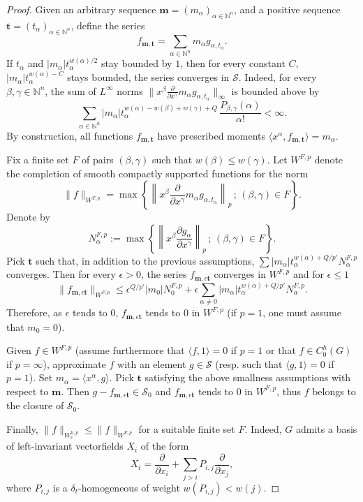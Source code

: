 \documentclass[11pt]{article}
\theoremstyle{definition}
\numberwithin{equation}{section}
\numberwithin{figure}{section}
\numberwithin{table}{section}
\newcommand{\N}{\mathbb{N}}
\newcommand*\eps{\epsilon}
\newcommand*\calS{\mathcal{S}}
\begin{document}
\begin{proof}
Given an arbitrary sequence $\mathbf{m}=(m_\alpha)_{\alpha\in\N^n}$, and a positive sequence $\mathbf{t}=(t_\alpha)_{\alpha\in\N^n}$, define the series
\[
f_{\mathbf{m},\mathbf{t}}=\sum_{\alpha\in\N^n}m_\alpha g_{\alpha,t_\alpha}.
\]
If $t_\alpha$ and $|m_\alpha| t_\alpha^{w(\alpha)/2}$ stay bounded by $1$, then for every constant $C$, $|m_\alpha| t_\alpha^{w(\alpha)-C}$ stays bounded, the series converges in $\calS$. Indeed, for every $\beta,\gamma\in\N^n$, the sum of $L^\infty$ norms $\|x^\beta \frac{\partial }{\partial x^{\gamma}}m_\alpha g_{\alpha,t_\alpha}\|_{\infty}$ is bounded above by
\[
\sum_{\alpha\in\N^n}|m_\alpha| t_\alpha^{w(\alpha)-w(\beta)+w(\gamma)+Q}\,\frac{P_{\beta,\gamma} (\alpha)}{\alpha!} <\infty.
\]
By construction, all functions $f_{\mathbf{m},\mathbf{t}}$ have prescribed moments $\langle x^\alpha,f_{\mathbf{m},\mathbf{t}}\rangle=m_\alpha$.

Fix a finite set $F$ of pairs $(\beta,\gamma)$ such that $w(\beta)\leq w(\gamma)$. Let $W^{F,p}$ denote the completion of smooth compactly supported functions for the norm
\[
\|f\|_{W^{F,p}}=\max\left\{\left\|x^\beta \frac{\partial }{\partial x^{\gamma}}m_\alpha g_{\alpha,t_\alpha} \right\|_{p}\,;\,(\beta,\gamma)\in F\right\}.
\]
Denote by
\[
N^{F,p}_\alpha :=\max\left\{\left\|x^\beta \frac{\partial g_{\alpha}}{\partial x^{\gamma}}\right\|_{p} \,;\,(\beta,\gamma)\in F\right\}.
\]
Pick $\mathbf{t}$ such that, in addition to the previous assumptions, $\sum|m_\alpha|t_\alpha^{w(\alpha)+Q/p'}N^{F,p}_\alpha$ converges. Then for every $\eps>0$, the series $f_{\mathbf{m},\eps\mathbf{t}}$ converges in $W^{F,p}$ and for $\eps \leq 1$
\[
\|f_{\mathbf{m},\eps \mathbf{t}}\|_{W^{F,p}}\leq
\eps^{Q/p'}|m_0|N^{F,p}_0 + \eps \sum_{\alpha\not=0} |m_\alpha|t_\alpha^{w(\alpha)+Q/p'} N^{F,p}_\alpha.
\]
Therefore, as $\eps$ tends to $0$, $f_{\mathbf{m},\eps\mathbf{t}}$ tends to $0$ in $W^{F,p}$ (if $p=1$, one must assume that $m_0=0$).

Given $f\in W^{F,p}$ (assume furthermore that $\langle f,1 \rangle=0$ if $p=1$ or that $f\in C_0^h(G)$ if $p=\infty$), approximate $f$ with an element $g\in\calS$ (resp. such that $\langle g,1 \rangle=0$ if $p=1$). Set $m_\alpha=\langle x^\alpha,g \rangle$. Pick $\mathbf{t}$ satisfying the above smallness assumptions with respect to $\mathbf{m}$. Then $g-f_{\mathbf{m},\eps\mathbf{t}}\in \calS_0$ and $f_{\mathbf{m},\eps\mathbf{t}}$ tends to $0$ in $W^{F,p}$, thus $f$ belongs to the closure of $\calS_0$.

Finally, $\|f\|_{W_c^{h,p}}\leq \|f\|_{W^{F,p}}$ for a suitable finite set $F$. Indeed, $G$ admits a basis of left-invariant vectorfields $X_i$ of the form
\begin{equation}\label{eq:13}
X_i=\frac{\partial}{\partial x_i}+\sum_{j>i}P_{i,j}
\frac{\partial}{\partial x_j},
\end{equation}
where $P_{i,j}$ is a $\delta_t$-homogeneous of weight $w(P_{i,j})<w(j)$.
\end{proof}
\end{document}
